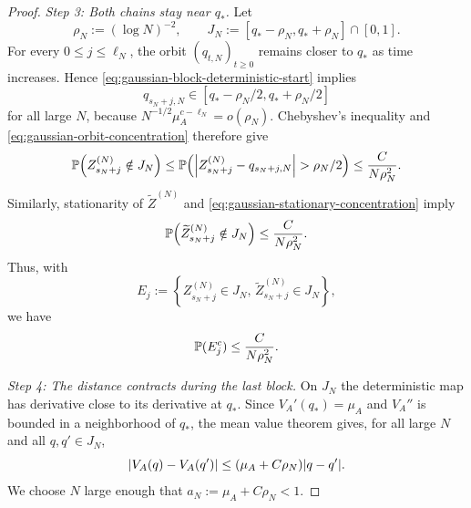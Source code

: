 \documentclass[11pt,reqno,a4paper]{article}
\newcommand{\Pp}{\P}
\begin{document}
\begin{proof}
  \emph{Step 3: Both chains stay near $q_\ast$.}
  Let
  \begin{equation*}
    \rho_N:=(\log N)^{-2},
    \qquad
    J_N:=[q_\ast-\rho_N,q_\ast+\rho_N]\cap[0,1].
  \end{equation*}
  For every $0\leq j\leq\ell_N$, the orbit $(q_{t,N})_{t\geq0}$ remains
  closer to $q_\ast$ as time increases. Hence \cref{eq:gaussian-block-deterministic-start}
  implies
  \begin{equation}\label{eq:gaussian-block-deterministic-local}
    q_{s_N+j,N}
    \in
    [q_\ast-\rho_N/2,q_\ast+\rho_N/2]
  \end{equation}
  for all large $N$, because
  $N^{-1/2}\mu_A^{c-\ell_N}=o(\rho_N)$. Chebyshev's inequality and
  \cref{eq:gaussian-orbit-concentration} therefore give
  \begin{equation*}
    \Pp\left(Z_{s_N+j}^{(N)}\notin J_N\right)
    \leq
    \Pp\left(
      \abs{Z_{s_N+j}^{(N)}-q_{s_N+j,N}}>\rho_N/2
    \right)
    \leq
    \frac{C}{N \rho_N^2}.
  \end{equation*}
  Similarly, stationarity of $\widetilde Z^{(N)}$ and
  \cref{eq:gaussian-stationary-concentration} imply
  \begin{equation*}
    \Pp\left(\widetilde Z_{s_N+j}^{(N)}\notin J_N\right)
    \leq
    \frac{C}{N \rho_N^2}.
  \end{equation*}
  Thus, with
  \begin{equation*}
    E_j
    :=
    \left\{
      Z_{s_N+j}^{(N)}\in J_N,\,
      \widetilde Z_{s_N+j}^{(N)}\in J_N
    \right\},
  \end{equation*}
  we have
  \begin{equation}\label{eq:gaussian-block-bad-probability}
    \Pp(E_j^c)
    \leq
    \frac{C}{N \rho_N^2}.
  \end{equation}

  \emph{Step 4: The distance contracts during the last block.}
  On $J_N$ the deterministic map has derivative close to its derivative at
  $q_\ast$. Since $V_A'(q_\ast)=\mu_A$ and $V_A''$ is bounded in a
  neighborhood of $q_\ast$, the mean value theorem gives, for all large $N$
  and all $q,q'\in J_N$,
  \begin{equation}\label{eq:gaussian-local-taylor-contraction}
    \abs{V_A(q)-V_A(q')}
    \leq
    \left(\mu_A+C \rho_N\right)\abs{q-q'}.
  \end{equation}
  We choose $N$ large enough that
  $
    a_N:=\mu_A+C \rho_N<1
  $.


\end{proof}
\end{document}
